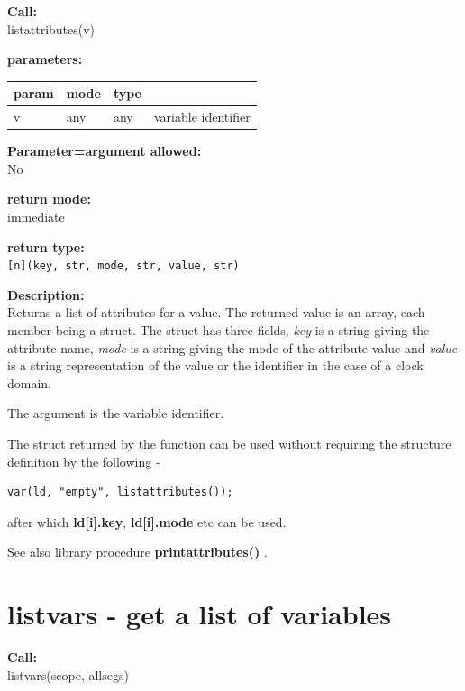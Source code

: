         {\bf Call:} \\
        listattributes(v)
        
        {\bf parameters:} \\
        \begin{tabular}{| l | l | l | l |}
        \hline
        param  & mode & type & \\
        \hline \hline
        v      & any  & any  & variable identifier \\ \hline
        \end{tabular}
        
        {\bf Parameter=argument allowed:} \\
        No
        
        {\bf return mode:} \\
        immediate

        {\bf return type:} \\
        \verb'[n](key, str, mode, str, value, str)'
        
        {\bf Description:} \\
        Returns a list of attributes for a value. The returned value is an
        array, each member being a struct. The struct has three fields, {\em
        key} is a string giving the attribute name, {\em mode} is a string
        giving the mode of the attribute value and {\em value} is a string
        representation of the value or the identifier in the case of a clock
        domain.
        
        The argument is the variable identifier.
        
        The struct returned by the function can be used without requiring the
        structure definition by the following -
        \begin{lstlisting}[gobble=8, language=threepl]
           var(ld, "empty", listattributes());
        \end{lstlisting}
        after which {\bf ld[i].key}, {\bf ld[i].mode} etc can be used.
        
        See also library procedure {\bf printattributes()} .


    \section{listvars - get a list of variables}\label{sec:iflistvars}
        
        {\bf Call:} \\
        listvars(scope, allsegs)
        
